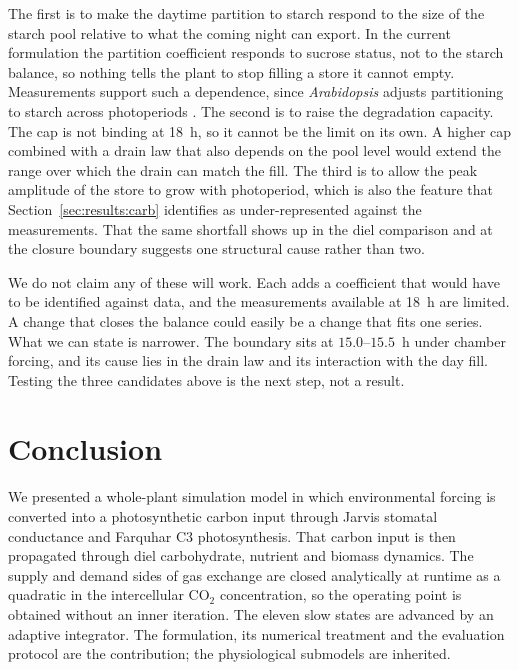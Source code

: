 The first is to make the daytime partition to starch respond to the size of the
starch pool relative to what the coming night can export. In the current
formulation the partition coefficient responds to sucrose status, not to the
starch balance, so nothing tells the plant to stop filling a store it cannot
empty. Measurements support such a dependence, since \textit{Arabidopsis}
adjusts partitioning to starch across photoperiods
\citep{Sulpice2014,Mengin2017}. The second is to raise the degradation
capacity. The cap is not binding at 18~h, so it cannot be the limit on its own.
A higher cap combined with a drain law that also depends on the pool level would
extend the range over which the drain can match the fill. The third
is to allow the peak amplitude of the store to grow with photoperiod, which is
also the feature that Section~\ref{sec:results:carb} identifies as
under-represented against the measurements. That the same shortfall shows up in
the diel comparison and at the closure boundary suggests one structural cause
rather than two.

We do not claim any of these will work. Each adds a coefficient that would have
to be identified against data, and the measurements available at 18~h are
limited. A change that closes the balance could easily be a change that fits one
series. What we can state is narrower. The boundary sits at $15.0$--$15.5$~h under
chamber forcing, and its cause lies in the drain law and its interaction with
the day fill. Testing the three candidates above is the next step, not a
result.

\section{Conclusion}
\label{sec:conclusion}

We presented a whole-plant simulation model in which environmental forcing is
converted into a photosynthetic carbon input through Jarvis stomatal conductance
and Farquhar C3 photosynthesis. That carbon input is then propagated through
diel carbohydrate, nutrient and biomass dynamics. The supply and demand
sides of gas exchange are closed analytically at runtime as a quadratic in the
intercellular CO$_2$ concentration, so the operating point is obtained without
an inner iteration. The eleven slow states are advanced by an adaptive
integrator. The formulation, its numerical treatment and the evaluation
protocol are the contribution; the physiological submodels are inherited.

